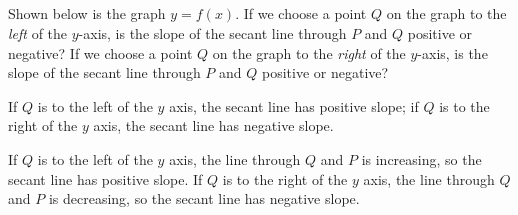 %
%
\subsection*{\Conceptual}
\begin{question} Shown below is the graph $y=f(x)$. If we choose a point $Q$ on the graph to the \emph{left} of the $y$-axis, is the slope of the secant line through $P$ and $Q$ positive or negative?
If we choose a point $Q$ on the graph to the \emph{right} of the $y$-axis, is the slope of the secant line through $P$ and $Q$ positive or negative?
\begin{center}
\end{center}
\end{question}
\begin{answer} If $Q$ is to the left of the $y$ axis, the secant line has positive slope;
if $Q$ is to the right of the $y$ axis, the secant line has negative slope.
\end{answer}
\begin{solution} If $Q$ is to the left of the $y$ axis, the line through $Q$ and $P$ is increasing, so the secant line has positive slope.
If $Q$ is to the right of the $y$ axis, the line through $Q$ and $P$ is decreasing, so the secant line has negative slope.
\end{solution}

